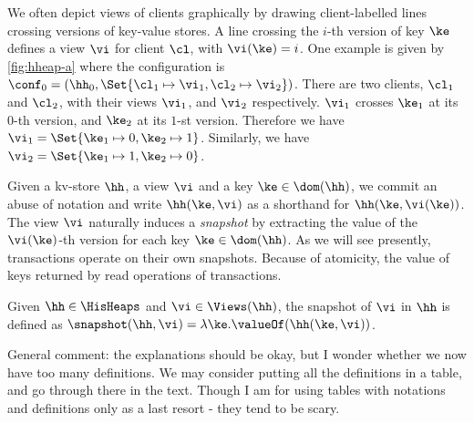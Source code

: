 We often depict views of clients graphically by drawing client-labelled lines crossing 
versions of key-value stores. A line crossing the $i$-th version of key $\ke$ defines a view 
$\vi$ for client $\cl$, with $\vi(\ke) = i$. One example is given by \cref{fig:hheap-a} where the configuration is
$\conf_0 = (\hh_0, \Set{\cl_1 \mapsto \vi_1, \cl_2 \mapsto \vi_2})$. 
There are two clients, 
$\cl_1$ and $\cl_2$, with their views $\vi_1$, and $\vi_2$ respectively. $\vi_1$ crosses $\ke_1$ at its $0$-th 
version, and $\ke_2$ at its $1$-st version. Therefore we have $\vi_1 = \Set{\ke_1 \mapsto 0, \ke_2 \mapsto 1}$. 
Similarly, we have $\vi_2 = \Set{\ke_1 \mapsto 1, \ke_2 \mapsto 0}$. 

Given a kv-store $\hh$, a view $\vi$ and a key $\ke \in \dom(\hh)$, 
we commit an abuse of notation and write $\hh(\ke, \vi)$ as a shorthand 
for $\hh(\ke, \vi(\ke))$. The view $\vi$ naturally induces a \emph{snapshot} 
by extracting the value of the $\vi(\ke)$-th version for each key $\ke \in \dom(\hh)$. 
As we will see presently, transactions operate on their own snapshots.
Because of atomicity, the value of keys returned 
by read operations of transactions. 
\begin{definition}[Snapshots]
\label{def:heaps}
\label{def:snapshot}
Given $\hh \in \HisHeaps$ and $\vi \in \Views(\hh)$, the snapshot of $\vi$ in 
$\hh$ is defined as $\snapshot(\hh, \vi) = \lambda \ke. \valueOf(\hh(\ke, \vi))$.
\end{definition}

\ac{General comment: the explanations should be okay, but I wonder whether we now have 
too many definitions. We may consider putting all the definitions in a table, and 
go through there in the text. Though I am for using tables with notations and 
definitions only as a last resort - they tend to be scary.}

